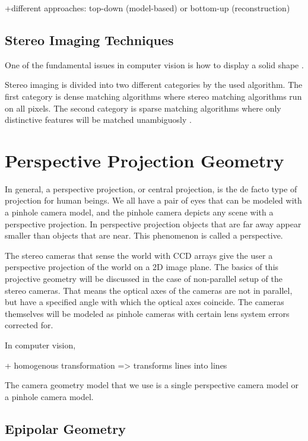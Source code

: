 \documentclass[12pt,a4paper,oneside,pdftex]{report}
\begin{document}
{    
+different approaches: top-down (model-based) or bottom-up (reconstruction)


\subsection{Stereo Imaging Techniques}
\label{subsection:stereo_imaging_techniques}

One of the fundamental issues in computer vision is how to display a solid shape \cite{Sonka07}. 

Stereo imaging is divided into two different categories by the used algorithm. The first category is dense matching algorithms where stereo matching algorithms run on all pixels. The second category is sparse matching algorithms where only distinctive features will be matched unambiguosly \cite{Terho10}.

\section{Perspective Projection Geometry}
\label{section:perspective_projection_geometry}

In general, a perspective projection, or central projection, is the de facto type of projection for human beings. We all have a pair of eyes that can be modeled with a pinhole camera model, and the pinhole camera depicts any scene with a perspective projection. In perspective projection objects that are far away appear smaller than objects that are near. This phenomenon is called a perspective. 

The stereo cameras that sense the world with CCD arrays give the user a perspective projection of the world on a 2D image plane. The basics of this projective geometry will be discussed in the case of non-parallel setup of the stereo cameras. That means the optical axes of the cameras are not in parallel, but have a specified angle with which the optical axes coincide. The cameras themselves will be modeled as pinhole cameras with certain lens system errors corrected for.

In computer vision, 

+ homogenous transformation => transforms lines into lines



The camera geometry model that we use is a single perspective camera model or a pinhole camera model.



\subsection{Epipolar Geometry}
\label{subsection:epipolar_geometry}

}
\end{document}
